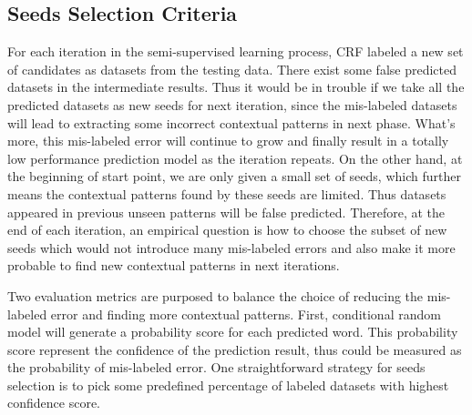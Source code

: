 \documentclass[11pt]{article}
\begin{document}
\subsection{Seeds Selection Criteria}
For each iteration in the semi-supervised learning process, CRF labeled a new set of candidates as datasets from the testing data. There exist some false predicted datasets in the intermediate results. Thus it would be in trouble if we take all the predicted datasets as new seeds for next iteration, since the mis-labeled datasets will lead to extracting some incorrect contextual patterns in next phase. What's more, this mis-labeled error will continue to grow and finally result in a totally low performance prediction model as the iteration repeats. On the other hand, at the beginning of start point, we are only given a small set of seeds, which further means the contextual patterns found by these seeds are limited. Thus datasets appeared in previous unseen patterns will be false predicted. Therefore, at the end of each iteration, an empirical question is how to choose the subset of new seeds which would not introduce many mis-labeled errors and also make it more probable to find new contextual patterns in next iterations. 

Two evaluation metrics are purposed to balance the choice of reducing the mis-labeled error and finding more contextual patterns. First, conditional random model will generate a probability score for each predicted word. This probability score represent the confidence of the prediction result, thus could be measured as the probability of mis-labeled error. One straightforward strategy for seeds selection is to pick some predefined percentage of labeled datasets with highest confidence score. 
\end{document}
